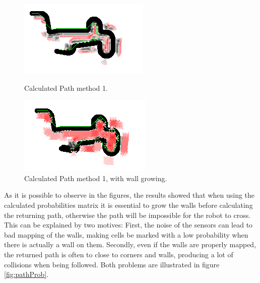\documentclass[oribibl]{llncs}
\begin{document}
\begin{figure}[ht]
\begin{minipage}[b]{0.45\linewidth}
\centering
\includegraphics[width=\textwidth]{pathProb.png}
\caption{Calculated Path method 1.}
\label{fig:pathProb}
\end{minipage}
\hspace{0.5cm}
\begin{minipage}[b]{0.45\linewidth}
\centering
\includegraphics[width=\textwidth]{pathProbEnlarge.png}
\caption{Calculated Path method 1, with wall growing.}
\label{fig:pathProbEnlarge}
\end{minipage}
\end{figure}

As it is possible to observe in the figures, the results showed that when using the calculated probabilities matrix it is essential to grow the walls before calculating the returning path, otherwise the path will be impossible for the robot to cross. This can be explained by two motives: First, the noise of the sensors can lead to bad mapping of the walls, making cells be marked with a low probability when there is actually a wall on them. Secondly, even if the walls are properly mapped, the returned path is often to close to corners and walls, producing a lot of collisions when being followed. Both problems are illustrated in figure \ref{fig:pathProb}.
\end{document}
